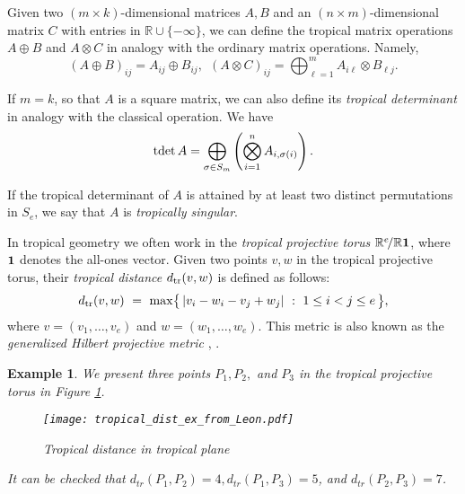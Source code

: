 \documentclass[12pt]{extarticle}
\numberwithin{theorem}{section}
\newtheorem{example}[theorem]{Example}
\newcommand{\RR}{\mathbb{R}}
\newcommand{\tdet}{\text{tdet\,}}
\begin{document}
Given two $(m\times k)$-dimensional matrices $A,B$ and an $(n\times m)$-dimensional matrix $C$ with entries in $\RR\cup\{-\infty\}$, we can define the tropical matrix operations $A\oplus B$ and $A\otimes C$ in analogy with the ordinary matrix operations. Namely,
\[(A\oplus B)_{ij} = A_{ij}\oplus B_{ij},\ \  (A\otimes C)_{ij} = \bigoplus_{\ell=1}^m A_{i\ell}\otimes B_{\ell j}.\]

If $m = k$, so that $A$ is a square matrix, we can also define its \emph{tropical determinant} in analogy with the classical operation. We have
\[\tdet A = \bigoplus_{\sigma\in S_m} \left(\bigotimes_{i=1}^n A_{i,\sigma(i)}\right).\]

If the tropical determinant of $A$ is attained by at least two distinct permutations in $S_e$, we say that $A$ is \emph{tropically singular}.

In tropical geometry we often work in the \emph{tropical projective torus} $\mathbb R^e \!/\mathbb R {\bf 1}$, where ${\bf 1}$ denotes the all-ones vector. Given two points $v, w$ in
the tropical projective torus, their {\em tropical
  distance} $d_{\rm tr}(v,w)$ is defined as follows:
\begin{equation}
\label{eq:tropmetric} d_{\rm tr}(v,w) \,\, = \,\,
\max \bigl\{\, |v_i - w_i  - v_j + w_j| \,\,:\,\, 1 \leq i < j \leq e \,\bigr\} ,
\end{equation}
where $v = (v_1, \ldots , v_e)$ and $w= (w_1, \ldots , w_e)$.
This metric is also known as the
{\em generalized Hilbert projective metric} 
\cite[\S 2.2]{AGNS}, \cite[\S 3.3]{CGQ}.

\begin{example}
We present three points $P_1, P_2,$ and $P_3$ in the tropical projective torus in Figure \ref{trop_dist_Leon}.
\begin{figure}[!ht]
\centering
\texttt{[image: tropical\_dist\_ex\_from\_Leon.pdf]}
\caption{Tropical distance in tropical plane}
\label{trop_dist_Leon}
\end{figure}
It can be checked that $d_{tr}(P_1, P_2) = 4, d_{tr}(P_1, P_3) = 5$, and $d_{tr}(P_2, P_3) = 7$.
\end{example}
\end{document}

